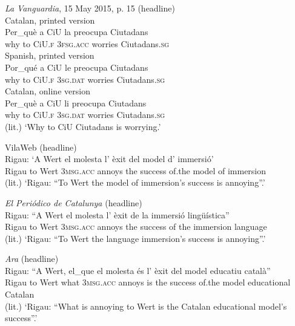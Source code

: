 \documentclass[output=paper,colorlinks,citecolor=brown,modfonts,nonflat]{langsci/langscibook}
\begin{document}
\ea%
 \emph{La} \emph{Vanguardia}, 15 May 2015, p. 15 (headline)
 \label{ex:royo:5}\\
 \ea Catalan, printed version \label{ex:royo:5a}\\
 \gll Per\_què a CiU la preocupa Ciutadans \\
why      to CiU.\textsc{f} 3\textsc{fsg.acc} worries   Ciutadans.\textsc{sg} \\


 \ex Spanish, printed version \label{ex:royo:5b}\\
 \gll Por\_qué a CiU le preocupa Ciutadans\\
why      to CiU.\textsc{f} \textsc{3sg.dat} worries    Ciutadans.\textsc{sg}\\


\ex Catalan, online version \label{ex:royo:5c}\\
 \gll Per\_què a CiU li preocupa Ciutadans \\
	why      to CiU.\textsc{f} 3\textsc{sg.dat} worries    Ciutadans.\textsc{sg}\\
 \glt (lit.) ‘Why to CiU Ciutadans is worrying.’

 \z
 \z


\ea%
 \label{ex:royo:6}
 \ea VilaWeb (headline)\\
 \gll Rigau: ‘A Wert el molesta l’ èxit del model d’ immersió’\\
Rigau   {\db}to Wert \textsc{3msg.acc} annoys   the success of.the model of immersion\\
 \glt (lit.) ‘Rigau: ``To Wert the model of immersion’s success is annoying''.’

 \ex \textit{El Periódico de Catalunya} (headline)\\
 \gll Rigau: “A Wert el molesta l’ èxit de la immersió lingüística”\\
 Rigau   {\db}to Wert 3\textsc{msg.acc} annoys  the success of the immersion language\\
 \glt (lit.) ‘Rigau: ``To Wert the language immersion’s success is annoying''.’

 \ex \textit{Ara} (headline)\\
 \gll Rigau: “A Wert, el\_que el molesta és l’ èxit del model educatiu català”\\
Rigau    to Wert what   \textsc{3msg.acc} annoys  is the success of.the model educational Catalan\\
 \glt (lit.) ‘Rigau: ``What is annoying to Wert is the Catalan educational model’s success''.’
 \z
 \z
\end{document}
